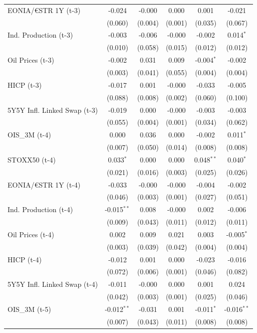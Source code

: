 \begin{longtable}[t]{lccccc}
EONIA/€STR 1Y (t-3) & -0.024 & -0.000 & 0.000 & 0.001 & -0.021\\
 & (0.060) & (0.004) & (0.001) & (0.035) & (0.067)\\
Ind. Production (t-3) & -0.003 & -0.006 & -0.000 & -0.002 & 0.014$^{*}$\\
 & (0.010) & (0.058) & (0.015) & (0.012) & (0.012)\\
Oil Prices (t-3) & -0.002 & 0.031 & 0.009 & -0.004$^{*}$ & -0.002\\
 & (0.003) & (0.041) & (0.055) & (0.004) & (0.004)\\
HICP (t-3) & -0.017 & 0.001 & -0.000 & -0.033 & -0.005\\
 & (0.088) & (0.008) & (0.002) & (0.060) & (0.100)\\
5Y5Y Infl. Linked Swap (t-3) & -0.019 & 0.000 & -0.000 & -0.003 & -0.003\\
 & (0.055) & (0.004) & (0.001) & (0.034) & (0.062)\\
OIS\_3M (t-4) & 0.000 & 0.036 & 0.000 & -0.002 & 0.011$^{*}$\\
 & (0.007) & (0.050) & (0.014) & (0.008) & (0.008)\\
STOXX50 (t-4) & 0.033$^{*}$ & 0.000 & 0.000 & 0.048$^{**}$ & 0.040$^{*}$\\
 & (0.021) & (0.016) & (0.003) & (0.025) & (0.026)\\
EONIA/€STR 1Y (t-4) & -0.033 & -0.000 & -0.000 & -0.004 & -0.002\\
 & (0.046) & (0.003) & (0.001) & (0.027) & (0.051)\\
Ind. Production (t-4) & -0.015$^{**}$ & 0.008 & -0.000 & 0.002 & -0.006\\
 & (0.009) & (0.043) & (0.011) & (0.012) & (0.011)\\
Oil Prices (t-4) & 0.002 & 0.009 & 0.021 & 0.003 & -0.005$^{*}$\\
 & (0.003) & (0.039) & (0.042) & (0.004) & (0.004)\\
HICP (t-4) & -0.012 & 0.001 & 0.000 & -0.023 & -0.016\\
 & (0.072) & (0.006) & (0.001) & (0.046) & (0.082)\\
5Y5Y Infl. Linked Swap (t-4) & -0.011 & -0.000 & 0.000 & 0.001 & 0.024\\
 & (0.042) & (0.003) & (0.001) & (0.025) & (0.046)\\
OIS\_3M (t-5) & -0.012$^{**}$ & -0.031 & 0.001 & -0.011$^{*}$ & -0.016$^{**}$\\
 & (0.007) & (0.043) & (0.011) & (0.008) & (0.008)\\

\end{longtable}
